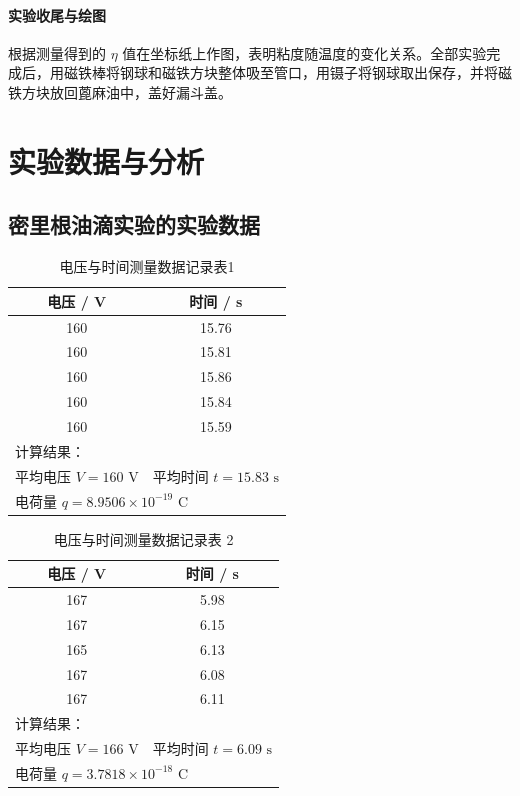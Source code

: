 \documentclass[11pt]{article}
\begin{document}
\paragraph{实验收尾与绘图}
根据测量得到的 $\eta$ 值在坐标纸上作图，表明粘度随温度的变化关系。全部实验完成后，用磁铁棒将钢球和磁铁方块整体吸至管口，用镊子将钢球取出保存，并将磁铁方块放回蓖麻油中，盖好漏斗盖。


\section{实验数据与分析}
\subsection{密里根油滴实验的实验数据}
\begin{table}[htbp]
    \centering
    \caption{电压与时间测量数据记录表1}
    \begin{tabular}{cc}
        \toprule
        电压 / V & 时间 / s \\
        \midrule
        160 & 15.76 \\
        160 & 15.81 \\
        160 & 15.86 \\
        160 & 15.84 \\
        160 & 15.59 \\
        \midrule
        \multicolumn{2}{l}{计算结果：} \\
        平均电压 $V = 160 \text{ V}$ & 平均时间 $t = 15.83 \text{ s}$ \\
        \multicolumn{2}{l}{电荷量 $q = 8.9506 \times 10^{-19} \text{ C}$} \\
        \bottomrule
    \end{tabular}
\end{table}
\begin{table}[htbp]
    \centering
    \caption{电压与时间测量数据记录表 2}
    \begin{tabular}{cc}
        \toprule
        电压 / V & 时间 / s \\
        \midrule
        167 & 5.98 \\
        167 & 6.15 \\
        165 & 6.13 \\
        167 & 6.08 \\
        167 & 6.11 \\
        \midrule
        \multicolumn{2}{l}{计算结果：} \\
        平均电压 $V = 166 \text{ V}$ & 平均时间 $t = 6.09 \text{ s}$ \\
        \multicolumn{2}{l}{电荷量 $q = 3.7818 \times 10^{-18} \text{ C}$} \\
        \bottomrule
    \end{tabular}
\end{table}
\end{document}
